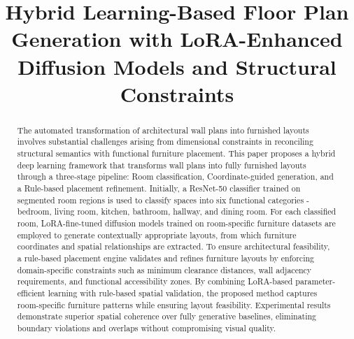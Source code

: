 \documentclass[10pt,conference]{IEEEtran}
\begin{document}
\title{Hybrid Learning-Based Floor Plan Generation with
LoRA-Enhanced Diffusion Models and Structural Constraints}

\author{
}

\maketitle

\begin{abstract}
The automated transformation of architectural wall plans into furnished layouts involves substantial challenges arising from dimensional constraints in reconciling structural semantics with functional furniture placement. This paper proposes a hybrid deep learning framework that transforms wall plans into fully furnished layouts through a three-stage pipeline: Room classification, Coordinate-guided generation, and a Rule-based placement refinement. 
Initially, a ResNet-50 classifier trained on segmented room regions is used to classify spaces into six functional categories - bedroom, living room, kitchen, bathroom, hallway, and dining room.
For each classified room, LoRA-fine-tuned diffusion models trained on room-specific furniture datasets are employed to generate contextually appropriate layouts, from which furniture coordinates and spatial relationships are extracted. To ensure architectural feasibility, a rule-based placement engine validates and refines furniture layouts by enforcing domain-specific constraints such as minimum clearance distances, wall adjacency requirements, and functional accessibility zones. By combining LoRA-based parameter-efficient learning with rule-based spatial validation, the proposed method captures room-specific furniture patterns while ensuring layout feasibility. Experimental results demonstrate superior spatial coherence over fully generative baselines, eliminating boundary violations and overlaps without compromising visual quality.
\end{abstract}
\end{document}

